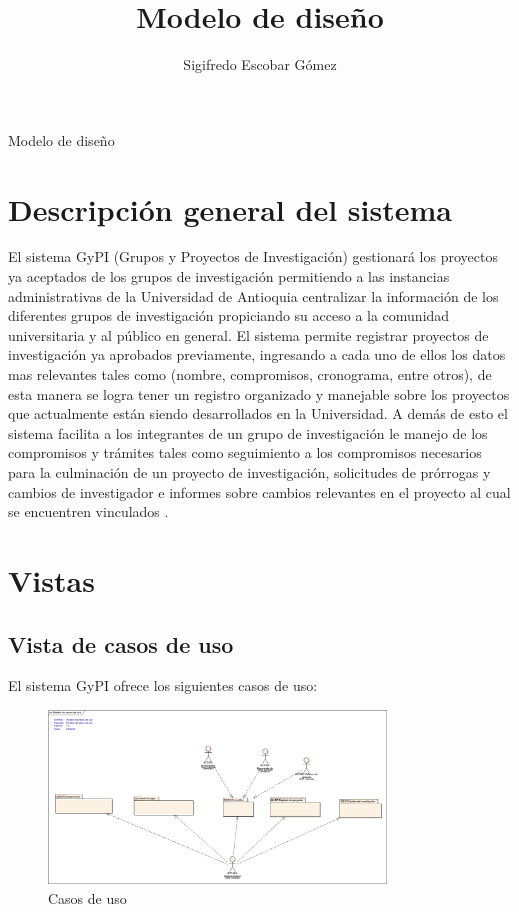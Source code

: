 \documentclass[12pt,oneside,letterpaper]{report}
\title{Modelo de diseño}
\author{Sigifredo Escobar Gómez}
\date{}
\begin{document}
\maketitle Modelo de diseño

\tableofcontents	%

\newpage

\chapter{Descripción general del sistema}
\maketitle El sistema GyPI (Grupos y Proyectos de Investigación) gestionará los proyectos ya aceptados de los grupos de investigación permitiendo a las instancias administrativas de la Universidad de Antioquia centralizar la información de los diferentes grupos de investigación propiciando su acceso a la comunidad universitaria y al público en general.
El sistema permite registrar proyectos de investigación ya aprobados previamente, ingresando a cada uno de ellos los datos mas relevantes tales como (nombre, compromisos, cronograma, entre otros), de esta manera se logra tener un registro organizado y manejable sobre los proyectos que actualmente están siendo desarrollados en la Universidad. A demás de esto el sistema facilita a los  integrantes de un grupo de investigación le manejo de los compromisos y trámites tales como seguimiento a los compromisos necesarios para la culminación de un proyecto de investigación, solicitudes de prórrogas y cambios de investigador e informes sobre cambios relevantes en el proyecto al cual se encuentren vinculados .

\newpage

\chapter{Vistas}
\section{Vista de casos de uso}
\maketitle El sistema GyPI  ofrece los siguientes casos de uso:

\begin{figure}[h!]
  \centering
    \includegraphics[width=0.80\textwidth]{./img/img1.png}
  \caption{Casos de uso}
\end{figure}
\end{document}
